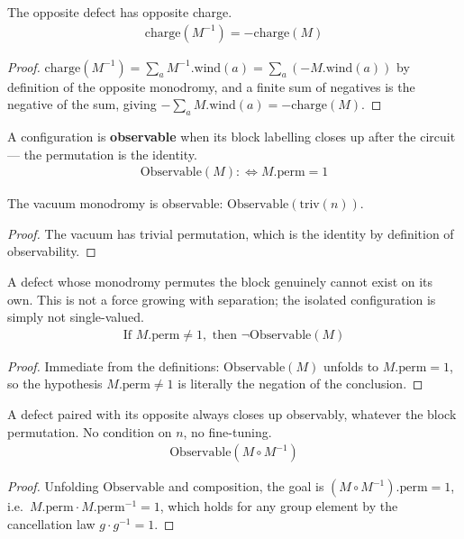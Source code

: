\begin{proposition}
The opposite defect has opposite charge.
\begin{align*}
\text{charge}(M^{-1}) = -\text{charge}(M)
\end{align*}
\begin{proof}
$\text{charge}(M^{-1}) = \sum_a M^{-1}.\text{wind}(a) = \sum_a (-M.\text{wind}(a))$ by definition of the opposite monodromy, and a finite sum of negatives is the negative of the sum, giving $-\sum_a M.\text{wind}(a) = -\text{charge}(M)$.
\end{proof}
\end{proposition}

\begin{definition}
A configuration is \textbf{observable} when its block labelling closes up after the circuit — the permutation is the identity.
\begin{align*}
\text{Observable}(M) :\Leftrightarrow M.\text{perm} = 1
\end{align*}
\end{definition}

\begin{proposition}
The vacuum monodromy is observable: $\text{Observable}(\text{triv}(n))$.
\end{proposition}
\begin{proof}
The vacuum has trivial permutation, which is the identity by definition of
observability.
\end{proof}

\begin{theorem}[Confinement]
A defect whose monodromy permutes the block genuinely cannot exist on its own.  This is not a force growing with separation; the isolated configuration is simply not single-valued.
\begin{align*}
\text{If } M.\text{perm} \neq 1, \text{ then } \neg \text{Observable}(M)
\end{align*}
\begin{proof}
Immediate from the definitions: $\text{Observable}(M)$ unfolds to $M.\text{perm}=1$, so the hypothesis $M.\text{perm}\neq1$ is literally the negation of the conclusion.
\end{proof}
\end{theorem}

\begin{theorem}
A defect paired with its opposite always closes up observably, whatever the block permutation.  No condition on $n$, no fine-tuning.
\begin{align*}
\text{Observable}(M \circ M^{-1})
\end{align*}
\begin{proof}
Unfolding $\text{Observable}$ and composition, the goal is $(M\circ M^{-1}).\text{perm}=1$, i.e.\ $M.\text{perm}\cdot M.\text{perm}^{-1}=1$, which holds for any group element by the cancellation law $g\cdot g^{-1}=1$.
\end{proof}
\end{theorem}

